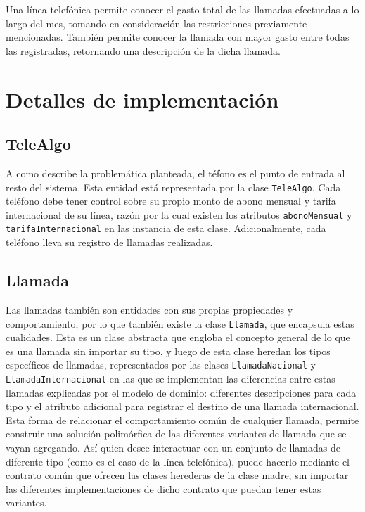 \documentclass[titlepage,a4paper]{article}
\begin{document}
Una línea telefónica permite conocer el gasto total de las llamadas efectuadas a lo largo del mes, tomando en consideración las restricciones previamente mencionadas. También permite conocer la llamada con mayor gasto entre todas las registradas, retornando una descripción de la dicha llamada.



\section{Detalles de implementación}\label{sec:diagramasdeclase}

\subsection{TeleAlgo}

A como describe la problemática planteada, el téfono es el punto de entrada al resto del sistema. Esta entidad está representada por la clase \lstinline{TeleAlgo}. Cada teléfono debe tener control sobre su propio monto de abono mensual y tarifa internacional de su línea, razón por la cual existen los atributos \lstinline{abonoMensual} y \lstinline{tarifaInternacional} en las instancia de esta clase. Adicionalmente, cada teléfono lleva su registro de llamadas realizadas.

\subsection{Llamada}

Las llamadas también son entidades con sus propias propiedades y comportamiento, por lo que también existe la clase \lstinline{Llamada}, que encapsula estas cualidades. Esta es un clase abstracta que engloba el concepto general de lo que es una llamada sin importar su tipo, y luego de esta clase heredan los tipos específicos de llamadas, representados por las clases \lstinline{LlamadaNacional} y \lstinline{LlamadaInternacional} en las que se implementan las diferencias entre estas llamadas explicadas por el modelo de dominio: diferentes descripciones para cada tipo y el atributo adicional para registrar el destino de una llamada internacional. Esta forma de relacionar el comportamiento común de cualquier llamada, permite construir una solución polimórfica de las diferentes variantes de llamada que se vayan agregando. Así quien desee interactuar con un conjunto de llamadas de diferente tipo (como es el caso de la línea telefónica), puede hacerlo mediante el contrato común que ofrecen las clases herederas de la clase madre, sin importar las diferentes implementaciones de dicho contrato que puedan tener estas variantes.
\end{document}
